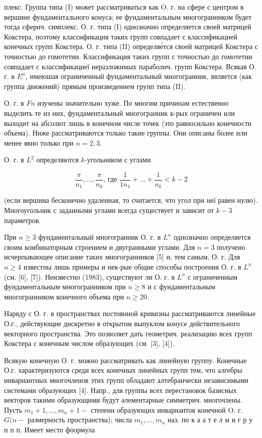 \documentclass[10pt]{article}
\begin{document}
плекс. Группа типа (I) может рассматриваться как O. г. на сфере с центром в вершине фундаментального конуса; ее фундаментальным многогранником будет тогда сферич. симплекс. О. г. типа (I) однозначно определяется своей матрицей Кокстера, поэтому классификация таких групп совпадает с классификацией конечных групп Кокстера. О. г. типа (II) определяе́тся своей матрицей Кокстера с точностью до гомотетии. Классификация таких групп с точностью до гомотетии совпадает с классификациеї неразложимых параболич. групп Кокстера. Всякая О. г. в $E^{n}$, имеюшая ограниченный фундаментальный многогранник, является (как группа движений) прямым произведением групп типа (II).

О. г. в $F n$ изучены значительно хуже. По многим причинам естественно выделить те из них, фундаментальный многогранник к-рых ограничен или выходит на абсолют лишь в конечном числе точек (это равносильно конечности объема). Ниже рассматриваются только такие группы. Они описаны более или менее явно только при $n=2,3$.

О. г. в $L^{2}$ определяются $k$-угольником с углами

\[
\frac{\pi}{n_{1}}, \ldots, \frac{\pi}{n_{k}} \text {, где } \frac{1}{1 n_{1}}+\ldots+\frac{1}{n_{k}}<k-2
\]

(если вершина бесконечно удаленная, то считается, что угол при неї равен нулю). Многоугольник с заданными углами всегда существует и зависит от $k-3$ параметров.

При $n \geqslant 3$ фундаментальный многогранник О. г. в $L^{n}$ однозначно определяется своим комбинаторным строением и двугранными углами. Для $n=3$ получено исчерпывающее описание таких многогранников [5] и, тем самым, О. г. Для $n \geqslant 4$ известны лишь примеры и нек-рые общие способы построения О. г. в $L^{n}$ (см. [6], [7]). Неизвестно (1983), существуют ли О. г. в $L^{n}$ с ограниченным фундаментальным многогранником при $n \geqslant 8$ и с фундаментальным многогранником конечного объема при $n \geqslant 20$.

Наряду с О. г. в пространствах постоянной кривизны рассматриваются линейные О.г., действующие дискретно в открытом выпуклом конусе действительного векторного пространства. Это позволяет дать геометрич. реализацию всех групп Кокстера с конечным числом образующих (см. [3], [4]).

Всякую конечную О. г. можно рассматривать как линейную группу. Конечные О.г. характеризуются среди всех конечных линейных групп тем, что алгебры инвариантных многочленов этих групп обладают алтебраически независимыми системами образующих [4]. Напр., для группы всех перестановок базисных векторов такими образующими будут әлементарные симметрич. многочлены. Пусть $m_{1}+1, \ldots, m_{n}+1-$ степени образующих инвариантов конечной O. г. $G(n-$ размерность пространства); числа $m_{1}, \ldots, m_{n}$ наз. по к а а т е л м и г р у п п
п. Имеет место фоормула
\end{document}
